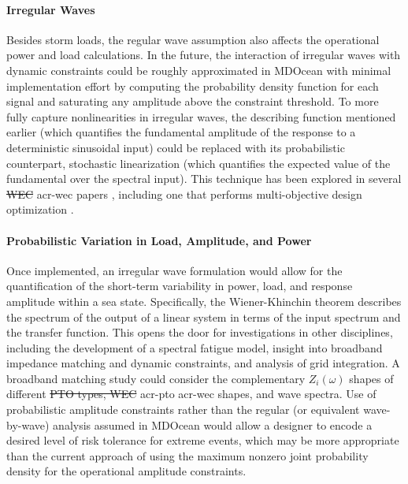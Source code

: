 \documentclass[a4paper,fleqn,colorlinks,unicode,lineno]{cas-dc} %
\makeatletter
\providecommand{\DIFaddtex}[1]{{\protect\color{blue}\uwave{#1}}} %
\providecommand{\DIFdeltex}[1]{{\protect\color{red}\sout{#1}}} %
\providecommand{\DIFaddbegin}{} %
\providecommand{\DIFaddend}{} %
\providecommand{\DIFdelbegin}{} %
\providecommand{\DIFdelend}{} %
\providecommand{\DIFadd}[1]{\texorpdfstring{\DIFaddtex{#1}}{#1}} %
\providecommand{\DIFdel}[1]{\texorpdfstring{\DIFdeltex{#1}}{}} %
\providecommand{\DIFscaledelfig}{0.5}
\newlength{\DIFdelgraphicswidth} %
\newlength{\DIFdelgraphicsheight} %
\providecommand{\DIFaddincludegraphics}[2][]{{\color{blue}\fbox{\DIFOincludegraphics[#1]{#2}}}} %
\providecommand{\DIFdelincludegraphics}[2][]{%
\sbox{\DIFdelgraphicsbox}{\DIFOincludegraphics[#1]{#2}}%
\settoboxwidth{\DIFdelgraphicswidth}{\DIFdelgraphicsbox} %
\settoboxtotalheight{\DIFdelgraphicsheight}{\DIFdelgraphicsbox} %
\scalebox{\DIFscaledelfig}{%
\parbox[b]{\DIFdelgraphicswidth}{\usebox{\DIFdelgraphicsbox}\\[-\baselineskip] \rule{\DIFdelgraphicswidth}{0em}}\llap{\resizebox{\DIFdelgraphicswidth}{\DIFdelgraphicsheight}{%
\setlength{\unitlength}{\DIFdelgraphicswidth}%
\begin{picture}(1,1)%
\thicklines\linethickness{2pt} %
{\color[rgb]{1,0,0}\put(0,0){\framebox(1,1){}}}%
{\color[rgb]{1,0,0}\put(0,0){\line( 1,1){1}}}%
{\color[rgb]{1,0,0}\put(0,1){\line(1,-1){1}}}%
\end{picture}%
}\hspace*{3pt}}} %
} %
\DeclareRobustCommand{\DIFaddbegin}{\DIFOaddbegin \let\includegraphics\DIFaddincludegraphics} %
\DeclareRobustCommand{\DIFaddend}{\DIFOaddend \let\includegraphics\DIFOincludegraphics} %
\DeclareRobustCommand{\DIFdelbegin}{\DIFOdelbegin \let\includegraphics\DIFdelincludegraphics} %
\DeclareRobustCommand{\DIFdelend}{\DIFOaddend \let\includegraphics\DIFOincludegraphics} %
\let\sout@orig\sout %
\renewcommand{\sout}[1]{\ifmmode\text{\sout@orig{\ensuremath{#1}}}\else\sout@orig{#1}\fi} %
\makeatother
\begin{document}
    \paragraph{Irregular Waves}
    Besides storm loads, the regular wave assumption also affects the operational power and load calculations.
    In the future, the interaction of irregular waves with dynamic constraints could be roughly approximated in MDOcean with minimal implementation effort by computing the probability density function for each signal and saturating any amplitude above the constraint threshold.
    To more fully capture nonlinearities in irregular waves, the describing function mentioned earlier (which quantifies the fundamental amplitude of the response to a deterministic sinusoidal input) could be replaced with its probabilistic counterpart, stochastic linearization (which quantifies the expected value of the fundamental over the spectral input).
    This technique has been explored in several \DIFdelbegin \DIFdel{WEC }\DIFdelend \DIFaddbegin \gls{acr-wec} \DIFaddend papers \citep{da_silva_statistical_2020,da_silva_stochastic_2023,kluger_synergistic_2017,folley_spectral-domain_2016,spanos_efficient_2016}, including one that performs multi-objective design optimization \citep{neshat_enhancing_2024}.

    \paragraph{Probabilistic Variation in Load, Amplitude, and Power}
    Once implemented, an irregular wave formulation would allow for the quantification of the short-term variability in power, load, and response amplitude within a sea state.
    Specifically, the Wiener-Khinchin theorem describes the spectrum of the output of a linear system in terms of the input spectrum and the transfer function.
    This opens the door for investigations in other disciplines, including the development of a spectral fatigue model, insight into broadband impedance matching and dynamic constraints, and analysis of grid integration.
    A broadband matching study could consider the complementary \DIFdelbegin \DIFdel{$Z_i(\omega)$ }\DIFdelend \DIFaddbegin \DIFadd{$\gls{sym-Z-i}(\gls{sym-omega})$ }\DIFaddend shapes of different \DIFdelbegin \DIFdel{PTO types, WEC }\DIFdelend \DIFaddbegin \gls{acr-pto} \DIFadd{types, }\gls{acr-wec} \DIFaddend shapes, and wave spectra.
    Use of probabilistic amplitude constraints rather than the regular (or equivalent wave-by-wave) analysis assumed in MDOcean would allow a designer to encode a desired level of risk tolerance for extreme events, which may be more appropriate than the current approach of using the maximum nonzero joint probability density for the operational amplitude constraints. 
\end{document}
